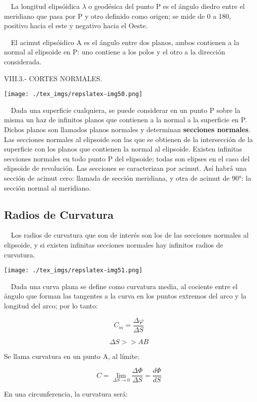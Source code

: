 \documentclass[]{article}
\begin{document}
~~La longitud elipsóidica \({\lambda }\) o geodésica del punto P es el
ángulo diedro entre el meridiano que pasa por P y otro definido como
origen; se mide de 0 a 180, positivo hacia el este y negativo hacia el
Oeste.

~~El acimut elipsóidico A es el ángulo entre dos planos, ambos contienen
a la normal al elipsoide en P: uno contiene a los polos y el otro a la
dirección considerada.

VIII.3.- CORTES NORMALES.

\texttt{[image: ./tex\_imgs/repslatex-img50.png]}

~~Dada una superficie cualquiera, se puede considerar en un punto P
sobre la misma un haz de infinitos planos que contienen a la normal a la
superficie en P. Dichos planos son llamados planos normales y determinan
\textbf{secciones normales}. Las secciones normales al elipsoide son las
que se obtienen de la intersección de la superficie con los planos que
contienen la normal al elipsoide. Existen infinitas secciones normales
en todo punto P del elipsoide; todas son elipses en el caso del
elipsoide de revolución. Las secciones se caracterizan por acimut. Así
habrá una sección de acimut cero: llamada de sección meridiana, y otra
de acimut de 90°: la sección normal al meridiano.

\hypertarget{radios-de-curvatura}{%
\subsection{Radios de Curvatura}\label{radios-de-curvatura}}

~~Los radios de curvatura que son de interés son los de las secciones
normales al elipsoide, y si existen infinitas secciones normales hay
infinitos radios de curvatura.

\texttt{[image: ./tex\_imgs/repslatex-img51.png]}

~~Dada una curva plana se define como curvatura media, al cociente entre
el ángulo que forman las tangentes a la curva en los puntos extremos del
arco y la longitud del arco; por lo tanto:

\[{C_{{m}}=\frac{\Delta \varphi }{\Delta S}}\]

\[\Delta S >> AB\]

Se llama curvatura en un punto A, al límite:

\[C = \lim_{\Delta S \to 0} \frac{\Delta \Phi}{\Delta S} = \frac{d \Phi}{dS}\]

En una circunferencia, la curvatura será:
\end{document}
